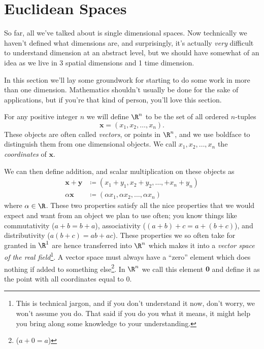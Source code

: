 \documentclass[../../templates/section]{subfiles}
\begin{document}
\section{Euclidean Spaces}\label{sec:euclidean-spaces}

So far, all we've talked about is single dimensional spaces. Now technically we
haven't defined what dimensions are, and surprisingly, it's actually \emph{very}
difficult to understand dimension at an abstract level, but we should have
somewhat of an idea as we live in 3 spatial dimensions and 1 time dimension.

In this section we'll lay some groundwork for starting to do some work in more
than one dimension. Mathematics shouldn't usually be done for the sake of
applications, but if you're that kind of person, you'll love this section.

\begin{definition}\label{def:Rn}
    For any positive integer $n$ we will define $\R^n$ to be the set of all
    ordered $n$-tuples
    \begin{equation*}
        \mathbf{x} = \left(x_1, x_2, \ldots, x_n\right).
    \end{equation*}
    These objects are often called \emph{vectors}, or points in $\R^n$, and we
    use boldface to distinguish them from one dimensional objects. We call
    $x_1, x_2, \ldots, x_n$ the \emph{coordinates} of $\mathbf{x}$.
\end{definition}

We can then define addition, and scalar multiplication on these objects as
\begin{align}
    \mathbf{x} + \mathbf{y} & \coloneqq \left(x_1 + y_1, x_2 + y_2, \ldots, + x_n + y_n\right) \\
    \alpha\mathbf{x} & \coloneqq \left(\alpha x_1, \alpha x_2, \ldots, \alpha x_n\right)
\end{align}
where $\alpha\in\R$. These two properties satisfy all the nice properties that
we would expect and want from an object we plan to use often; you know things
like commutativity ($a + b = b + a$), associativity ($(a + b) + c = a + (b + c)$),
and distributivity ($a(b + c) = ab + ac$). These properties we so often take for
granted in $\R^1$ are hence transferred into $\R^n$ which makes it into a
\emph{vector space of the real field}\footnote{This is technical jargon, and if
you don't understand it now, don't worry, we won't assume you do. That said if
you do you what it means, it might help you bring along some knowledge to your
understanding.}. A vector space must always have a ``zero'' element which does
nothing if added to something else\footnote{($a + 0 = a$)}. In $\R^n$ we call this
element $\mathbf{0}$ and define it as the point with all coordinates equal to 0.
\end{document}
